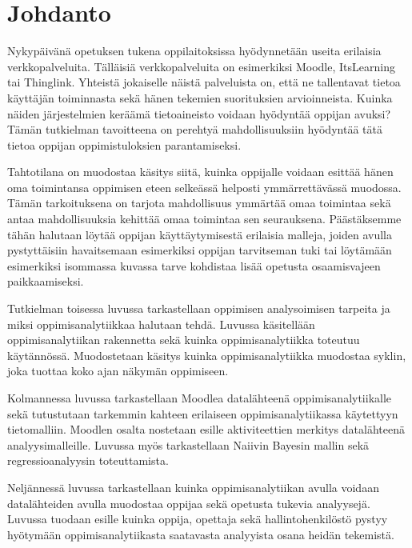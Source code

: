 \chapter{Johdanto\label{johdanto}}

Nykypäivänä opetuksen tukena oppilaitoksissa hyödynnetään useita erilaisia verkkopalveluita. Tälläisiä verkkopalveluita on esimerkiksi Moodle, ItsLearning tai Thinglink. Yhteistä jokaiselle näistä palveluista on, että ne tallentavat tietoa käyttäjän toiminnasta sekä hänen tekemien suorituksien arvioinneista. Kuinka näiden järjestelmien keräämä tietoaineisto voidaan hyödyntää oppijan avuksi? Tämän tutkielman tavoitteena on perehtyä mahdollisuuksiin hyödyntää tätä tietoa oppijan oppimistuloksien parantamiseksi.

Tahtotilana on muodostaa käsitys siitä, kuinka oppijalle voidaan esittää hänen oma toimintansa oppimisen eteen selkeässä helposti ymmärrettävässä muodossa. Tämän tarkoituksena on tarjota mahdollisuus ymmärtää omaa toimintaa sekä antaa mahdollisuuksia kehittää omaa toimintaa sen seurauksena. Päästäksemme tähän halutaan löytää oppijan käyttäytymisestä erilaisia malleja, joiden avulla pystyttäisiin havaitsemaan esimerkiksi oppijan tarvitseman tuki tai löytämään esimerkiksi isommassa kuvassa tarve kohdistaa lisää opetusta osaamisvajeen paikkaamiseksi.

Tutkielman toisessa luvussa \emph{} tarkastellaan oppimisen analysoimisen tarpeita ja miksi oppimisanalytiikkaa halutaan tehdä. Luvussa käsitellään oppimisanalytiikan rakennetta sekä kuinka oppimisanalytiikka toteutuu käytännössä. Muodostetaan käsitys kuinka oppimisanalytiikka muodostaa syklin, joka tuottaa koko ajan näkymän oppimiseen.

Kolmannessa luvussa \emph{} tarkastellaan Moodlea datalähteenä oppimisanalytiikalle sekä tutustutaan tarkemmin kahteen erilaiseen oppimisanalytiikassa käytettyyn tietomalliin. Moodlen osalta nostetaan esille aktiviteettien merkitys datalähteenä analyysimalleille. Luvussa myös tarkastellaan Naiivin Bayesin mallin sekä regressioanalyysin toteuttamista.

Neljännessä luvussa \emph{} tarkastellaan kuinka oppimisanalytiikan avulla voidaan datalähteiden avulla muodostaa oppijaa sekä opetusta tukevia analyysejä. Luvussa tuodaan esille kuinka oppija, opettaja sekä hallintohenkilöstö pystyy hyötymään oppimisanalytiikasta saatavasta analyyista osana heidän tekemistä.

